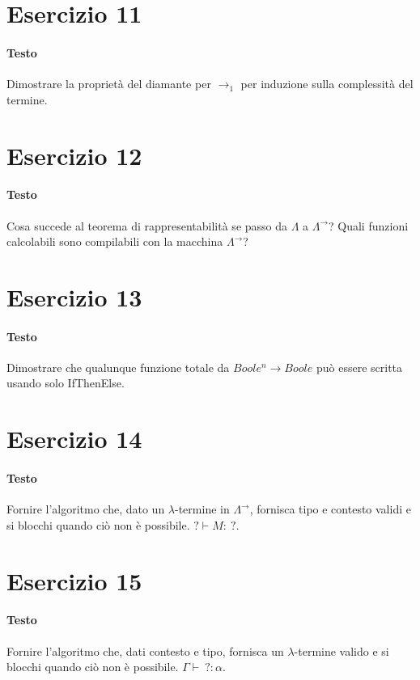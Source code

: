 \documentclass[a4paper,10pt]{article}
\begin{document}
\section*{Esercizio 11}
\paragraph{Testo}
Dimostrare la proprietà del diamante per $\rightarrow_1$ per induzione sulla complessità del termine.

\section*{Esercizio 12}
\paragraph{Testo}
Cosa succede al teorema di rappresentabilità se passo da $\Lambda$ a $\Lambda^\rightarrow$? Quali funzioni calcolabili sono compilabili con la macchina $\Lambda^\rightarrow$?

\section*{Esercizio 13}
\paragraph{Testo}
Dimostrare che qualunque funzione totale da $Boole^n \rightarrow Boole$ può essere scritta usando solo IfThenElse.

\section*{Esercizio 14}
\paragraph{Testo}
Fornire l’algoritmo che, dato un $\lambda$-termine in $\Lambda^\rightarrow$, fornisca tipo e contesto validi e si blocchi quando ciò non è possibile. $? \vdash M :\: ?$.

\section*{Esercizio 15}
\paragraph{Testo}
Fornire l’algoritmo che, dati contesto e tipo, fornisca un $\lambda$-termine valido e si blocchi quando ciò non è possibile. $\Gamma \vdash \: ? : \alpha$.
\end{document}
